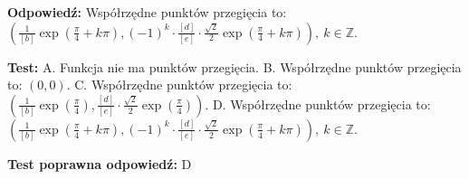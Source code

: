\documentclass[12pt, a4paper]{article}
\theoremstyle{definition} %
\newcommand{\odpStart}{\noindent \textbf{Odpowiedź:}\newline}    %
\newcommand{\odpStop}{\newline}                                             %
\newcommand{\testStart}{\noindent \textbf{Test:}\newline} %
\newcommand{\testStop}{\newline} %
\newcommand{\kluczStart}{\noindent \textbf{Test poprawna odpowiedź:}\newline} %
\newcommand{\kluczStop}{\newline} %
\begin{document}
\odpStart
Współrzędne punktów przegięcia to: $(\frac{1}{[b]}\exp(\frac{\pi}{4} + k\pi),(-1)^k \cdot \frac{[d]}{[e]} \cdot \frac{\sqrt{2}}{2} \exp(\frac{\pi}{4} + k\pi)), \ k\in\mathbb{Z}$.
\odpStop

\testStart
A. Funkcja nie ma punktów przegięcia.
B. Współrzędne punktów przegięcia to: $(0,0)$.
C. Współrzędne punktów przegięcia to:  $(\frac{1}{[b]}\exp(\frac{\pi}{4}),\frac{[d]}{[e]} \cdot \frac{\sqrt{2}}{2} \exp(\frac{\pi}{4}))$.
D. Współrzędne punktów przegięcia to:  $(\frac{1}{[b]}\exp(\frac{\pi}{4} + k\pi),(-1)^k \cdot \frac{[d]}{[e]} \cdot \frac{\sqrt{2}}{2} \exp(\frac{\pi}{4} + k\pi)), \ k\in\mathbb{Z}$.
\testStop

\kluczStart
D
\kluczStop
\end{document}
